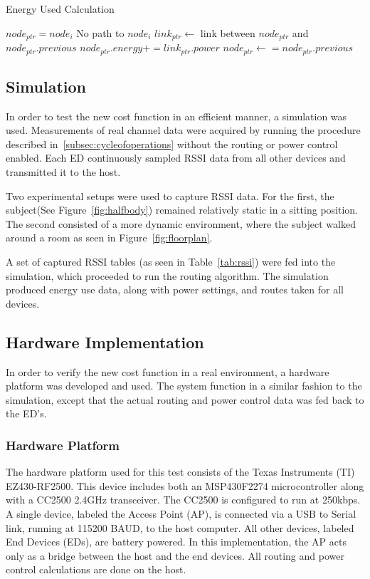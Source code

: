 \documentclass{article}
\begin{document}
\begin{algorithm}[!ht]
\caption{Energy Used Calculation}
\label{alg:energyused}
\begin{algorithmic}[1]
	\STATE $node_{ptr} = node_i$
		\STATE No path to $node_i$
	\ELSE
			\STATE $link_{ptr} \leftarrow $ link between $node_{ptr}$ and $node_{ptr}.previous$
			\STATE $node_{ptr}.energy += link_{ptr}.power$
			\STATE $node_{ptr} \leftarrow = node_{ptr}.previous$
		\ENDWHILE
	\ENDIF
\ENDFOR
\end{algorithmic}
\end{algorithm}


\subsection{Simulation}\label{sec:simulation}
In order to test the new cost function in an efficient manner, a simulation was used. Measurements of real channel data were acquired by running the procedure described in~\ref{subsec:cycleofoperations} without the routing or power control enabled. Each ED continuously sampled RSSI data from all other devices and transmitted it to the host. 

Two experimental setups were used to capture RSSI data. For the first, the subject(See Figure~\ref{fig:halfbody}) remained relatively static in a sitting position. The second consisted of a more dynamic environment, where the subject walked around a room as seen in Figure~\ref{fig:floorplan}. 

A set of captured RSSI tables (as seen in Table~\ref{tab:rssi}) were fed into the simulation, which proceeded to run the routing algorithm. The simulation produced energy use data, along with power settings, and routes taken for all devices.

\subsection{Hardware Implementation}\label{sec:hardware}
In order to verify the new cost function in a real environment, a hardware platform was developed and used. The system function in a similar fashion to the simulation, except that the actual routing and power control data was fed back to the ED's.

\subsubsection{Hardware Platform}
The hardware platform used for this test consists of the Texas Instruments (TI) EZ430-RF2500. This device includes both an MSP430F2274 microcontroller along with a CC2500 2.4GHz transceiver. The CC2500 is configured to run at 250kbps.
A single device, labeled the Access Point (AP), is connected via a USB to Serial link, running at 115200 BAUD, to the host computer. All other devices, labeled End Devices (EDs), are battery powered. In this implementation, the AP acts only as a bridge between the host and the end devices. All routing and power control calculations are done on the host.
\end{document}
